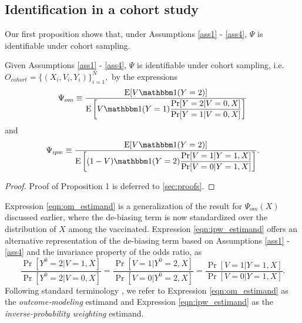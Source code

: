 \documentclass[11pt]{article}
\begin{document}
\subsection*{Identification in a cohort study}
Our first proposition shows that, under  Assumptions \ref{ass1} - \ref{ass4}, $\Psi$ is identifiable under cohort sampling. 
\begin{proposition}\label{prop1}
    Given Assumptions \ref{ass1} - \ref{ass4}, $\Psi$ is identifiable under cohort sampling, i.e. $O_{cohort} = \{(X_i, V_i, Y_i)\}_{i=1}^N,$ by the expressions 
    \begin{equation}\label{eqn:om_estimand}
        \Psi_{om} \equiv \dfrac{\E[V \mathbbm 1 (Y = 2)]}{\E\left[V \mathbbm 1(Y = 1) \dfrac{\Pr[Y = 2 | V = 0, X]}{\Pr[Y = 1 | V = 0, X]}  \right]}
    \end{equation}
    and 
    \begin{equation}\label{eqn:ipw_estimand}
        \Psi_{ipw} \equiv \dfrac{\E[V \mathbbm 1 (Y = 2)]}{\E\left[ (1 - V) \mathbbm 1(Y = 2) \dfrac{\Pr[V=1|Y = 1, X]}{\Pr[V=0|Y = 1, X]}\right]}.
    \end{equation}
    \end{proposition}
    \begin{proof}
        Proof of Proposition 1 is deferred to \ref{sec:proofs}.
    \end{proof}

Expression \ref{eqn:om_estimand} is a generalization of the result for $\Psi_{om}(X)$ discussed earlier, where the de-biasing term is now standardized over the distribution of $X$ among the vaccinated. Expression \ref{eqn:ipw_estimand} offers an alternative representation of the de-biasing term based on Assumptions \ref{ass1} - \ref{ass4} and the invariance property of the odds ratio, as 
$$\frac{\Pr[Y^0 = 2| V = 1, X]}{\Pr[Y^0 = 2 | V = 0, X]} = \frac{\Pr[V = 1 | Y^0 = 2,  X]}{\Pr[V = 0 | Y^0 = 2, X]} =\frac{\Pr[V = 1 | Y = 1, X]}{\Pr[V = 0 | Y = 1, X]}.$$
Following standard terminology \cite{robins_estimating_1992}, we refer to Expression \ref{eqn:om_estimand} as the \textit{outcome-modeling} estimand and Expression \ref{eqn:ipw_estimand} as the \textit{inverse-probability weighting} estimand.
\end{document}
